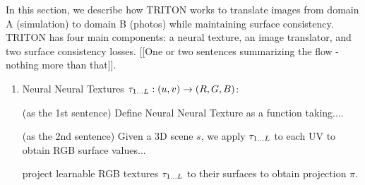 \documentclass{article}
\begin{document}
	In this section, we describe how TRITON works to translate images from domain A (simulation) to domain B (photos) while maintaining surface consistency. 
	TRITON has four main components: a neural texture, an image translator, and two surface consistency losses. [[One or two sentences summarizing the flow - nothing more than that]].
	
	
	\begin{enumerate}
		\item{
			Neural Neural Textures $\tau_{1\dots L}: (u,v) \rightarrow (R,G,B)$: 
			
			
			(as the 1st sentence) Define Neural Neural Texture as a function taking....
			
			(as the 2nd sentence)
			Given a 3D scene $s$, we apply $\tau_{1\dots L}$ to each UV to obtain RGB surface values...
			
			project learnable RGB textures $\tau_{1\dots L}$ to their surfaces to obtain projection $\pi$. 
			
			
}
\end{enumerate}
\end{document}
